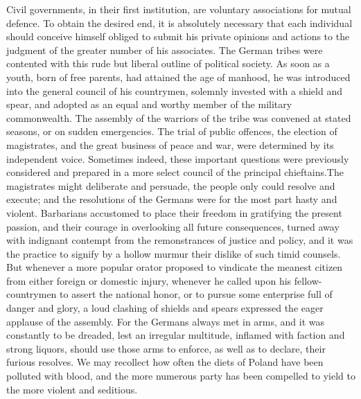 


Civil governments, in their first institution, are voluntary
associations for mutual defence. To obtain the desired end, it is
absolutely necessary that each individual should conceive himself
obliged to submit his private opinions and actions to the
judgment of the greater number of his associates. The German
tribes were contented with this rude but liberal outline of
political society. As soon as a youth, born of free parents, had
attained the age of manhood, he was introduced into the general
council of his countrymen, solemnly invested with a shield and
spear, and adopted as an equal and worthy member of the military
commonwealth. The assembly of the warriors of the tribe was
convened at stated seasons, or on sudden emergencies. The trial
of public offences, the election of magistrates, and the great
business of peace and war, were determined by its independent
voice. Sometimes indeed, these important questions were
previously considered and prepared in a more select council of
the principal chieftains.\footnotemark[45] The magistrates might deliberate and
persuade, the people only could resolve and execute; and the
resolutions of the Germans were for the most part hasty and
violent. Barbarians accustomed to place their freedom in
gratifying the present passion, and their courage in overlooking
all future consequences, turned away with indignant contempt from
the remonstrances of justice and policy, and it was the practice
to signify by a hollow murmur their dislike of such timid
counsels. But whenever a more popular orator proposed to
vindicate the meanest citizen from either foreign or domestic
injury, whenever he called upon his fellow-countrymen to assert
the national honor, or to pursue some enterprise full of danger
and glory, a loud clashing of shields and spears expressed the
eager applause of the assembly. For the Germans always met in
arms, and it was constantly to be dreaded, lest an irregular
multitude, inflamed with faction and strong liquors, should use
those arms to enforce, as well as to declare, their furious
resolves. We may recollect how often the diets of Poland have
been polluted with blood, and the more numerous party has been
compelled to yield to the more violent and seditious.\footnotemark[46]

